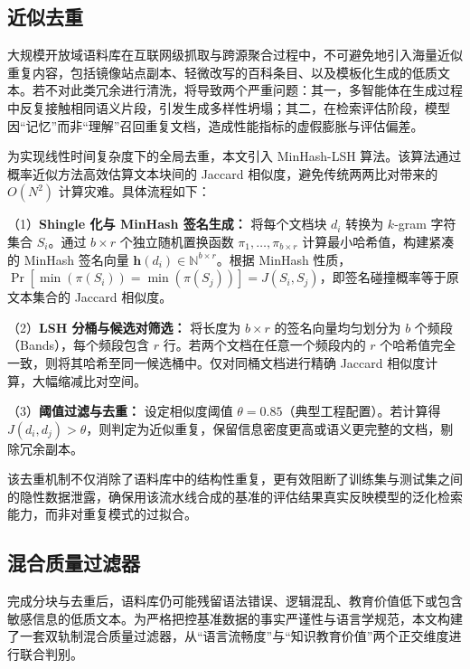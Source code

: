 \subsection{近似去重}



大规模开放域语料库在互联网级抓取与跨源聚合过程中，不可避免地引入海量近似重复内容，包括镜像站点副本、轻微改写的百科条目、以及模板化生成的低质文本。若不对此类冗余进行清洗，将导致两个严重问题：其一，多智能体在生成过程中反复接触相同语义片段，引发生成多样性坍塌；其二，在检索评估阶段，模型因“记忆”而非“理解”召回重复文档，造成性能指标的虚假膨胀与评估偏差。



为实现线性时间复杂度下的全局去重，本文引入 MinHash-LSH 算法。该算法通过概率近似方法高效估算文本块间的 Jaccard 相似度，避免传统两两比对带来的 $O(N^2)$ 计算灾难。具体流程如下：

（1）\textbf{Shingle 化与 MinHash 签名生成：} 将每个文档块 $d_i$ 转换为 $k$-gram 字符集合 $S_i$。通过 $b \times r$ 个独立随机置换函数 $\pi_1, \dots, \pi_{b \times r}$ 计算最小哈希值，构建紧凑的 MinHash 签名向量 $\mathbf{h}(d_i) \in \mathbb{N}^{b \times r}$。根据 MinHash 性质，$\Pr[\min(\pi(S_i)) = \min(\pi(S_j))] = J(S_i, S_j)$，即签名碰撞概率等于原文本集合的 Jaccard 相似度。

（2）\textbf{LSH 分桶与候选对筛选：} 将长度为 $b \times r$ 的签名向量均匀划分为 $b$ 个频段（Bands），每个频段包含 $r$ 行。若两个文档在任意一个频段内的 $r$ 个哈希值完全一致，则将其哈希至同一候选桶中。仅对同桶文档进行精确 Jaccard 相似度计算，大幅缩减比对空间。

（3）\textbf{阈值过滤与去重：} 设定相似度阈值 $\theta = 0.85$（典型工程配置）。若计算得 $J(d_i, d_j) > \theta$，则判定为近似重复，保留信息密度更高或语义更完整的文档，剔除冗余副本。




该去重机制不仅消除了语料库中的结构性重复，更有效阻断了训练集与测试集之间的隐性数据泄露，确保用该流水线合成的基准的评估结果真实反映模型的泛化检索能力，而非对重复模式的过拟合。



\subsection{混合质量过滤器}



完成分块与去重后，语料库仍可能残留语法错误、逻辑混乱、教育价值低下或包含敏感信息的低质文本。为严格把控基准数据的事实严谨性与语言学规范，本文构建了一套双轨制混合质量过滤器，从“语言流畅度”与“知识教育价值”两个正交维度进行联合判别。



